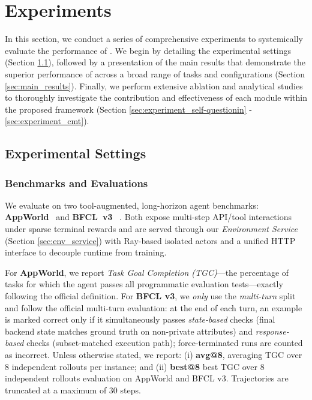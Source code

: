 \section{Experiments}
\label{sec:experiments}

In this section, we conduct a series of comprehensive experiments to systemically evaluate the performance of \AgentEvolver. We begin by detailing the experimental settings (Section \ref{sec:exp_settings}), followed by a presentation of the main results that demonstrate the superior performance of \AgentEvolver across a broad range of tasks and configurations (Section \ref{sec:main_results}). Finally, we perform extensive ablation and analytical studies to thoroughly investigate the contribution and effectiveness of each module within the proposed framework (Section \ref{sec:experiment_self-questionin} - \ref{sec:experiment_cmt}).

\subsection{Experimental Settings}
\label{sec:exp_settings}
\subsubsection{Benchmarks and Evaluations}
We evaluate \AgentEvolver on two tool-augmented, long-horizon agent benchmarks: \textbf{AppWorld}~\citep{trivedi2024appworld} and \textbf{BFCL~v3} ~\citep{patil2025bfcl}. Both expose multi-step API/tool interactions under sparse terminal rewards and are served through our \emph{Environment Service} (Section \ref{sec:env_service}) with Ray-based isolated actors and a unified HTTP interface to decouple runtime from training. 

For \textbf{AppWorld}, we report \emph{Task Goal Completion (TGC)}---the percentage of tasks for which the agent passes all programmatic evaluation tests---exactly following the official definition. 
For \textbf{BFCL v3}, we \emph{only} use the \emph{multi-turn} split and follow the official multi-turn evaluation: at the end of each turn, an example is marked correct only if it simultaneously passes \emph{state-based} checks (final backend state matches ground truth on non-private attributes) and \emph{response-based} checks (subset-matched execution path); force-terminated runs are counted as incorrect. 
Unless otherwise stated, we report:
(i) \textbf{avg@8}, averaging TGC over 8 independent rollouts per instance; and
(ii) \textbf{best@8} best TGC over 8 independent rollouts evaluation on AppWorld and BFCL v3.
Trajectories are truncated at a maximum of 30 steps.


